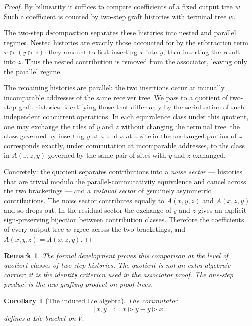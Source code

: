 \documentclass[11pt]{article}
\newtheorem{corollary}[theorem]{Corollary}
\newtheorem{remark}[theorem]{Remark}
\begin{document}
\begin{proof}
By bilinearity it suffices to compare coefficients of a fixed output tree
\(w\).  Such a coefficient is counted by two-step graft histories with terminal
tree \(w\).

The two-step decomposition separates these histories into nested and parallel
regimes.  Nested histories are exactly those accounted for by the subtraction
term \(x\triangleright(y\triangleright z)\): they amount to first inserting
\(x\) into \(y\), then inserting the result into \(z\).  Thus the nested
contribution is removed from the associator, leaving only the parallel regime.

The remaining histories are parallel: the two insertions occur at mutually
incomparable addresses of the same receiver tree.  We pass to a quotient of
two-step graft histories, identifying those that differ only by the
serialisation of such independent concurrent operations.  In each equivalence
class under this quotient, one may exchange the roles of \(y\) and \(z\)
without changing the terminal tree: the class governed by inserting \(y\)
at \(a\) and \(x\) at a site in the unchanged portion of \(z\) corresponds
exactly, under commutation at incomparable addresses, to the class in
\(A(x,z,y)\) governed by the same pair of sites with \(y\) and \(z\)
exchanged.

Concretely: the quotient separates contributions into a \emph{noise sector}
--- histories that are trivial modulo the parallel-commutativity equivalence
and cancel across the two bracketings --- and a \emph{residual sector} of
genuinely asymmetric contributions.  The noise sector contributes equally to
\(A(x,y,z)\) and \(A(x,z,y)\) and so drops out.  In the residual sector the
exchange of \(y\) and \(z\) gives an explicit sign-preserving bijection
between contribution classes.  Therefore the coefficients of every output
tree \(w\) agree across the two bracketings, and \(A(x,y,z)=A(x,z,y)\).
\end{proof}

\begin{remark}
The formal development proves this comparison at the level of quotient classes
of two-step histories.  The quotient is not an extra algebraic carrier; it is
the identity criterion used in the associator proof.  The one-step product is
the raw grafting product on proof trees.
\end{remark}

\begin{corollary}[The induced Lie algebra]\label{cor:lie}
The commutator
\[
[x,y]:=x\triangleright y-y\triangleright x
\]
defines a Lie bracket on \(V\).
\end{corollary}
\end{document}
